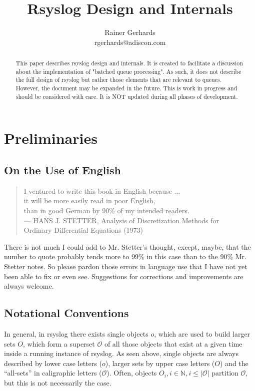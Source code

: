 \documentclass[a4paper,10pt]{article}
\title{Rsyslog Design and Internals}
\author{Rainer Gerhards\\
rgerhards@adiscon.com}
\newcommand{\IN}{\mathbb{N}}
\begin{document}
\maketitle

\begin{abstract}
This paper describes rsyslog design and internals. It is created to facilitate a discussion about the implementation of "batched queue processing". As such, it does not describe the full design of rsyslog but rather those elements that are relevant to queues. However, the document may be expanded in the future. This is work in progress and should be considered with care. It is NOT updated during all phases of development.
\end{abstract}

\tableofcontents

\section{Preliminaries}
\subsection{On the Use of English}
\begin{quotation}
\begin{flushright}
I ventured to write this book in English because ... \\
it will be more easily read in poor English, \\
than in good German by 90\% of my intended readers. \\
--- HANS J. STETTER, Analysis of Discretization Methods for \\
Ordinary Differential Equations (1973)
\end{flushright}
\end{quotation}

There is not much I could add to Mr. Stetter's thought, except, maybe, that the number to quote probably tends more to 99\% in this case than to the 90\% Mr. Stetter notes. So please pardon those errors in language use that I have not yet been able to fix or even see. Suggestions for corrections and improvements are always welcome.
\subsection{Notational Conventions}
In general, in rsyslog there exists single objects $o$, which are used to build larger sets $O$, which form a superset $\mathcal{O}$ of all those objects that exist at a given time inside a running instance of rsyslog. As seen above, single objects are always described by lower case letters ($o$), larger sets by upper case letters ($O$) and the ``all-sets'' in caligraphic letters ($\mathcal{O}$). Often, objects $O_i, i \in \IN, i \le |\mathcal{O}|$ partition $\mathcal{O}$, but this is not necessarily the case.
\end{document}
